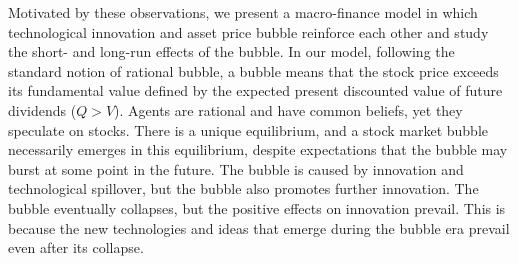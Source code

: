 \documentclass[a4paper,12pt]{article}
\numberwithin{equation}{section}
\theoremstyle{plain}
\begin{document}
Motivated by these observations, we present a macro-finance model in which technological innovation and asset price bubble reinforce each other and study the short- and long-run effects of the bubble. In our model, following the standard notion of rational bubble, a bubble means that the stock price exceeds its fundamental value defined by the expected present discounted value of future dividends ($Q>V$). Agents are rational and have common beliefs, yet they speculate on stocks. There is a unique equilibrium, and a stock market bubble necessarily emerges in this equilibrium, despite expectations that the bubble may burst at some point in the future. The bubble is caused by innovation and technological spillover, but the bubble also promotes further innovation. The bubble eventually collapses, but the positive effects on innovation prevail. This is because the new technologies and ideas that emerge during the bubble era prevail even after its collapse.
\end{document}

